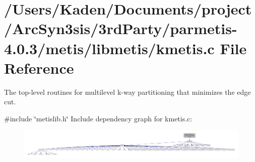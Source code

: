 \hypertarget{a00909}{}\section{/\+Users/\+Kaden/\+Documents/project/\+Arc\+Syn3sis/3rd\+Party/parmetis-\/4.0.3/metis/libmetis/kmetis.c File Reference}
\label{a00909}


The top-\/level routines for multilevel k-\/way partitioning that minimizes the edge cut.  


{\ttfamily \#include \char`\"{}metislib.\+h\char`\"{}}\newline
Include dependency graph for kmetis.\+c\+:\nopagebreak
\begin{figure}[H]
\begin{center}
\leavevmode
\includegraphics[width=350pt]{a00910}
\end{center}
\end{figure}
